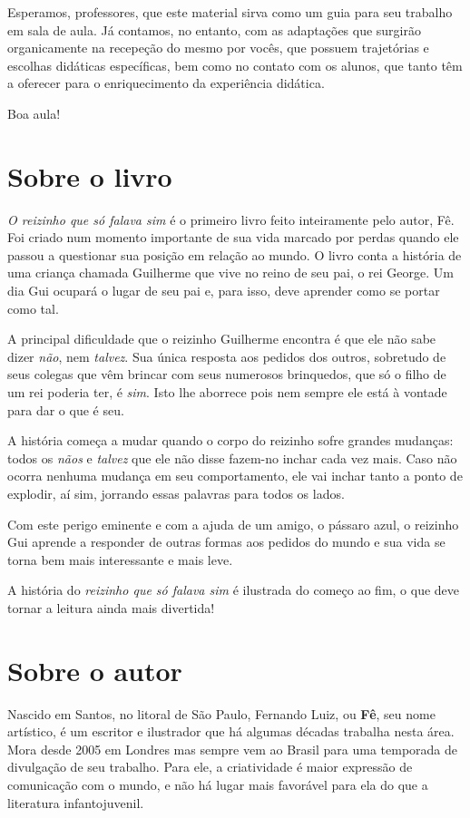 \documentclass[11pt]{extarticle}
\begin{document}
Esperamos, professores, que este material sirva como um guia 
para seu trabalho em sala de aula. Já contamos, no entanto, com as adaptações
que surgirão organicamente na recepeção do mesmo por vocês, que possuem 
trajetórias e escolhas didáticas específicas, bem como no contato com os 
alunos, que tanto têm a oferecer para o enriquecimento da experiência didática.

Boa aula!


\section{Sobre o livro}

\textit{O reizinho que só falava sim} é o primeiro livro feito inteiramente pelo autor, Fê.
Foi criado num momento importante de sua vida marcado por perdas quando ele 
passou a questionar sua posição em relação ao mundo. O livro conta a história de uma criança chamada Guilherme
que vive no reino de seu pai, o rei George. Um dia Gui ocupará o lugar de seu pai e,
para isso, deve aprender como se portar como tal. 

A principal dificuldade que o reizinho Guilherme encontra é que ele não sabe dizer \textit{não},
nem \textit{talvez}. Sua única resposta aos pedidos dos outros, sobretudo de seus colegas
que vêm brincar com seus numerosos brinquedos, que só o filho de um rei poderia ter, 
é \textit{sim}. Isto lhe aborrece pois nem sempre ele está à vontade para dar o que é seu. 

A história começa a mudar quando o corpo do reizinho sofre grandes mudanças:
todos os \textit{nãos} e \textit{talvez} que ele não disse fazem-no inchar
cada vez mais. Caso não ocorra nenhuma mudança em seu comportamento, 
ele vai inchar tanto a ponto de explodir, aí sim, jorrando essas palavras
para todos os lados. 

Com este perigo eminente e com a ajuda de um amigo, o pássaro azul,
o reizinho Gui aprende a responder de outras formas aos pedidos
do mundo e sua vida se torna bem mais interessante e mais leve.

A história do \textit{reizinho que só falava sim} é ilustrada do começo ao fim,
o que deve tornar a leitura ainda mais divertida!


\section{Sobre o autor}

Nascido em Santos, no litoral de São Paulo, Fernando Luiz, ou \textbf{Fê}, seu
nome artístico, é um escritor e ilustrador que há algumas décadas trabalha nesta área.
Mora desde 2005 em Londres mas sempre vem ao Brasil para uma temporada de divulgação de 
seu trabalho. Para ele, a criatividade é maior expressão de comunicação com o mundo, e não
há lugar mais favorável para ela do que a literatura infantojuvenil. 
\end{document}
